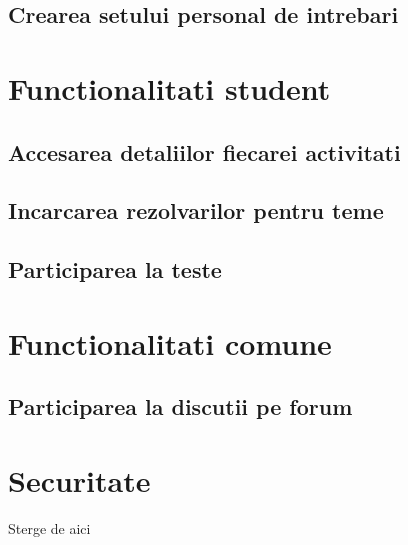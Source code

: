 \documentclass[12pt, a4paper, oneside, romanian]{teza-upb}
\begin{document}
\subsection{Crearea setului personal de intrebari}

\section{Functionalitati student}
\subsection{Accesarea detaliilor fiecarei activitati}
\subsection{Incarcarea rezolvarilor pentru teme}
\subsection{Participarea la teste}

\section{Functionalitati comune}
\subsection{Participarea la discutii pe forum}

\section{Securitate}

Sterge de aici\cite{typescriptlangorgintro}



\end{document}

